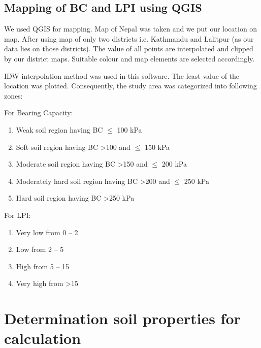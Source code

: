 \subsection{Mapping of BC and LPI using QGIS}
We used QGIS for mapping. Map of Nepal was taken and we put our location on map. After using map of only two districts i.e. Kathmandu and Lalitpur (as our data lies on those districts). The value of all points are interpolated and clipped by our district maps. Suitable colour and map elements are selected accordingly.

IDW interpolation method was used in this software. The least value of the location was plotted. Consequently, the study area was categorized into following zones:

For Bearing Capacity:
\begin{enumerate}
\item{Weak soil region having BC $\le$ 100 kPa}
\item{Soft soil region having BC \textgreater 100 and $\le$ 150 kPa}
\item{Moderate soil region having BC \textgreater 150 and $\le$ 200 kPa}
\item{Moderately hard soil region having BC \textgreater 200 and $\le$ 250 kPa}
\item{Hard soil region having BC \textgreater 250 kPa}
\end{enumerate}

For LPI:
\begin{enumerate}
\item{Very low from 0 – 2}
\item{Low from 2 – 5}
\item{High from 5 – 15}
\item{Very high from \textgreater 15}
\end{enumerate}

\section{Determination soil properties for calculation}
